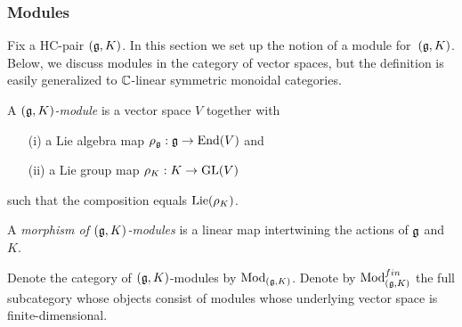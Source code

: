 %

\subsubsection{Modules}

Fix a HC-pair $(\mathfrak g,K)$. In this section we set up the notion of a module for~$(\mathfrak g,K)$. Below, we discuss modules in the category of vector spaces, but the definition is easily generalized to $\mathbb C$-linear symmetric monoidal categories.

\begin{dfn} \label{hcmod}
A {\em $(\mathfrak g,K)$-module} is a vector space $V$ together with 
\begin{itemize}
\item[(i)] a Lie algebra map $\rho_\mathfrak g : \mathfrak g \to {\rm End}(V)$ and
\item[(ii)] a Lie group map $\rho_K : K \to {\rm GL}(V)$ 
\end{itemize}
such that the composition
\ben
{}
\een
equals ${\rm Lie}(\rho_K)$. 

A {\em morphism of $(\mathfrak g,K)$-modules} is a linear map intertwining the actions of $\mathfrak g$ and $K$.

Denote the category of $(\mathfrak g,K)$-modules by ${\rm Mod}_{(\mathfrak g,K)}$.
Denote by ${\rm Mod}_{(\mathfrak g,K)}^{fin}$ the full subcategory whose objects consist of modules whose underlying vector space is finite-dimensional.
\end{dfn}


